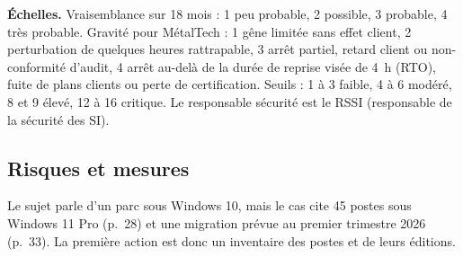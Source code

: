 \documentclass[11pt,a4paper]{article}
\begin{document}
\textbf{Échelles.} Vraisemblance sur 18 mois : 1 peu probable, 2 possible, 3 probable, 4 très probable. Gravité pour MétalTech : 1 gêne limitée sans effet client, 2 perturbation de quelques heures rattrapable, 3 arrêt partiel, retard client ou non-conformité d'audit, 4 arrêt au-delà de la durée de reprise visée de 4~h (RTO), fuite de plans clients ou perte de certification. Seuils : 1 à 3 faible, 4 à 6 modéré, 8 et 9 élevé, 12 à 16 critique. Le responsable sécurité est le RSSI (responsable de la sécurité des SI).

\subsection*{Risques et mesures}
Le sujet parle d'un parc sous Windows 10, mais le cas cite 45 postes sous Windows 11 Pro (p.~28) et une migration prévue au premier trimestre 2026 (p.~33). La première action est donc un inventaire des postes et de leurs éditions.
\end{document}
